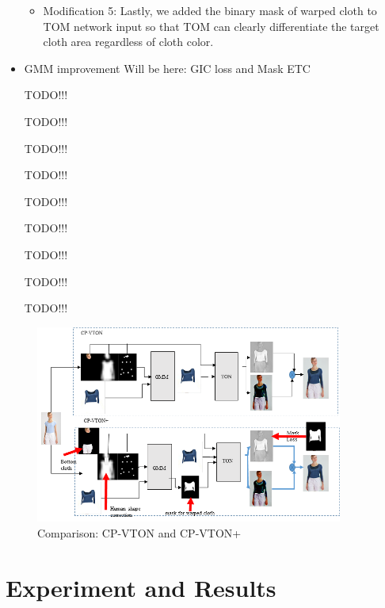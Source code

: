 \documentclass[runningheads]{llncs}
\begin{document}
\begin{itemize}
\begin{itemize}
\item Modification 5: Lastly, we added the binary mask of warped cloth to TOM network input so that TOM can clearly differentiate the target cloth area regardless of cloth color.  

\end{itemize}

\item GMM improvement Will be here: GIC loss and Mask ETC

TODO!!!

TODO!!!

TODO!!!

TODO!!!

TODO!!!

TODO!!!

TODO!!!

TODO!!!

TODO!!!






















\end{itemize}


\begin{figure}
\centering
\includegraphics[height=6.5cm, scale=1]{figures/cpvton+pipeline.png}   
\caption{Comparison: CP-VTON and CP-VTON+}
\label{fig:piepline}
\end{figure}

\section{Experiment and Results} 
\end{document}
